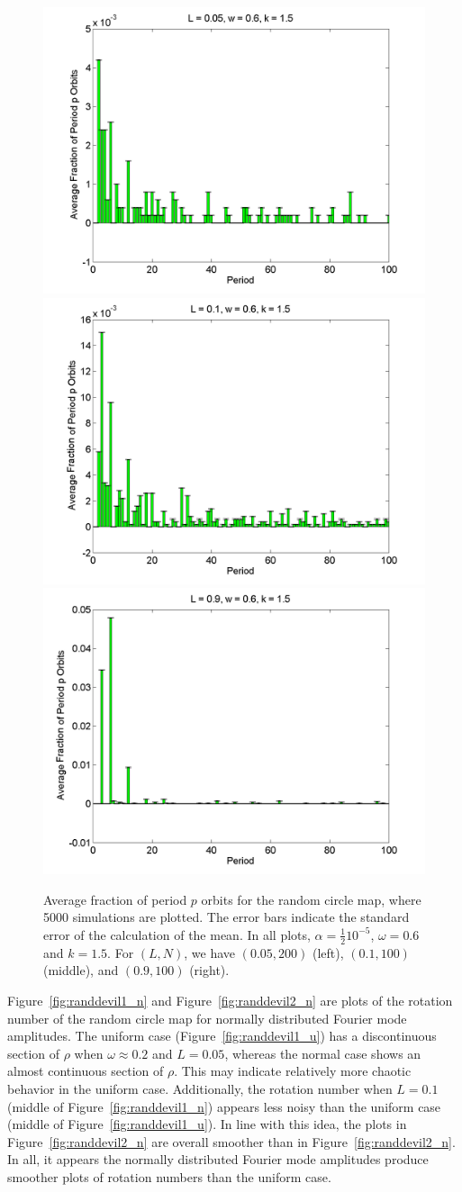 \begin{figure}[H]\linespread{1}
\caption[Average fraction of period $p$ orbits for the random circle
map (normal distribution), for $\alpha=\frac{1}{2}10^{-5}$, $\omega=0.6$ and $k=1.5$]{Average fraction of period $p$ orbits for the random circle
map, where 5000 simulations are plotted. The error bars indicate
the standard error of the calculation of the mean. In all plots,
$\alpha = \frac{1}{2}10^{-5}$, $\omega=0.6$ and $k=1.5$. For $(L,N)$,
we have $(0.05, 200)$ (left), $(0.1, 100)$
(middle), and $(0.9, 100)$ (right).}\label{fig:rcirchist_n2_ha}
	\begin{center}	\includegraphics[width=.33\textwidth]{figs/rcirc_hist_n_halfa_L_005_w_06_k_15_sims_5000.png}\hfill
\includegraphics[width=.33\textwidth]{figs/rcirc_hist_n_halfa_L_01_w_06_k_15_sims_5000.png}\hfill
\includegraphics[width=.33\textwidth]{figs/rcirc_hist_n_halfa_L_09_w_06_k_15_sims_5000.png}
	\end{center}
\end{figure}

Figure~\ref{fig:randdevil1_n} and Figure~\ref{fig:randdevil2_n} are
plots of the rotation number of the random circle map for normally
distributed Fourier mode amplitudes. The uniform case
(Figure~\ref{fig:randdevil1_u}) has a discontinuous section of $\rho$
when $\omega \approx 0.2$ and $L=0.05$, whereas the normal case shows
an almost continuous section of $\rho$. This may indicate relatively
more chaotic
behavior in the uniform case. Additionally, the rotation number when
$L=0.1$ (middle of Figure~\ref{fig:randdevil1_n}) appears less noisy
than the uniform case (middle of
Figure~\ref{fig:randdevil1_u}). In line with this idea, the plots in
Figure~\ref{fig:randdevil2_n} are overall smoother than in
Figure~\ref{fig:randdevil2_n}. In all, it appears the normally
distributed Fourier mode amplitudes produce smoother plots of rotation
numbers than the uniform case.

